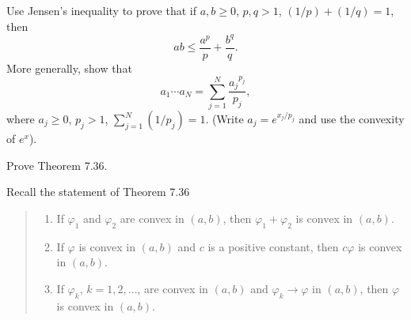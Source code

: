 \begin{problem}
Use Jensen's inequality to prove that if $a,b\geq 0$, $p,q>1$,
$(1/p)+(1/q)=1$, then
\[
ab\leq\frac{a^p}{p}+\frac{b^q}{q}.
\]
More generally, show that
\[
a_1\dotsm a_N=\sum_{j=1}^N\frac{{a_j}^{p_j}}{p_j},
\]
where $a_j\geq 0$, $p_j>1$, $\sum_{j=1}^N(1/p_j)=1$. (Write
$a_j=e^{x_j/p_j}$ and use the convexity of $e^x$).
\end{problem}
\begin{solution}
\end{solution}

\begin{problem}
Prove Theorem 7.36.
\end{problem}
\begin{solution}
Recall the statement of Theorem 7.36
\begin{quote}
\begin{enumerate}[label=\textnormal{(\roman*)},noitemsep]
\item If $\varphi_1$ and $\varphi_2$ are convex in $(a,b)$, then
  $\varphi_1+\varphi_2$ is convex in $(a,b)$.
\item If $\varphi$ is convex in $(a,b)$ and $c$ is a positive constant,
  then $c\varphi$ is convex in $(a,b)$.
\item If $\varphi_k$, $k=1,2,\dotsc$, are convex in $(a,b)$ and
  $\varphi_k\to\varphi$ in $(a,b)$, then $\varphi$ is convex in $(a,b)$.
\end{enumerate}
\end{quote}
\end{solution}


